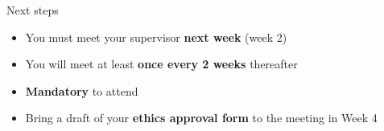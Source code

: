 \begin{frame}{Next steps}
	\begin{itemize}
		\pause\item You must meet your supervisor \textbf{next week} (week 2)
		\pause\item You will meet at least \textbf{once every 2 weeks} thereafter
		\pause\item \textbf{Mandatory} to attend
		\pause\item Bring a draft of your \textbf{ethics approval form} to the meeting in Week 4
	\end{itemize}
\end{frame}
